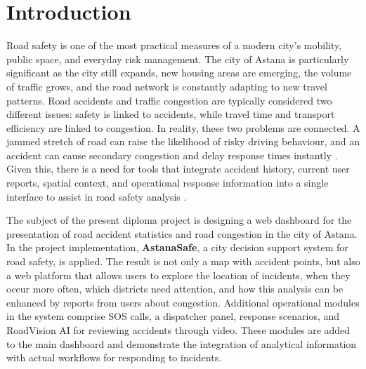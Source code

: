 ﻿\documentclass[12pt,a4paper]{report}
\begin{document}
\tableofcontents
\clearpage

\setcounter{page}{1}

\chapter*{Introduction}

Road safety is one of the most practical measures of a modern city's mobility, public space, and everyday risk management. The city of Astana is particularly significant as the city still expands, new housing areas are emerging, the volume of traffic grows, and the road network is constantly adapting to new travel patterns. Road accidents and traffic congestion are typically considered two different issues: safety is linked to accidents, while travel time and transport efficiency are linked to congestion. In reality, these two problems are connected. A jammed stretch of road can raise the likelihood of risky driving behaviour, and an accident can cause secondary congestion and delay response times instantly \cite{fhwa2015}. Given this, there is a need for tools that integrate accident history, current user reports, spatial context, and operational response information into a single interface to assist in road safety analysis \cite{who2023}.

The subject of the present diploma project is designing a web dashboard for the presentation of road accident statistics and road congestion in the city of Astana. In the project implementation, \textbf{AstanaSafe}, a city decision support system for road safety, is applied. The result is not only a map with accident points, but also a web platform that allows users to explore the location of incidents, when they occur more often, which districts need attention, and how this analysis can be enhanced by reports from users about congestion. Additional operational modules in the system comprise SOS calls, a dispatcher panel, response scenarios, and RoadVision AI for reviewing accidents through video. These modules are added to the main dashboard and demonstrate the integration of analytical information with actual workflows for responding to incidents.
\end{document}
